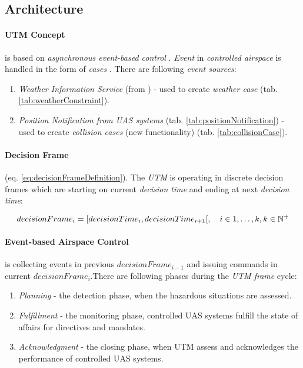 \subsection{Architecture}\label{sec:utmArchitecture}
\paragraph{UTM Concept} is based on \emph{asynchronous event-based control} \cite{zimmer2011rule}. \emph{Event} in \emph{controlled airspace} is handled in the form of \emph{cases} \cite{prevot2016uas}. There are following \emph{event sources}:

\begin{enumerate}
    \item \emph{Weather Information Service} (from \cite{zimmer2014selective}) - used to create \emph{weather case} (tab. \ref{tab:weatherConstraint}).
    
    \item \emph{Position Notification from UAS systems} (tab. \ref{tab:positionNotification}) - used to create \emph{collision cases} (new functionality) (tab. \ref{tab:collisionCase}).
\end{enumerate}


\paragraph{Decision Frame} (eq. \ref{eq:decisionFrameDefinition}). The \emph{UTM} is operating in discrete decision frames which are starting on current \emph{decision time} and ending at  next \emph{decision  time}:

\begin{equation}\label{eq:decisionFrameDefinition}
    decision Frame_i = [decision Time_i, decision Time_{i+1}[,\quad i \in {1,\dots,k}, k \in \mathbb{N}^+
\end{equation}

\paragraph{Event-based Airspace Control} is collecting  events in  previous $decisionFrame_{i-1}$ and issuing commands in current $decisionFrame_i$.There are following phases during the \emph{UTM frame} cycle:
\begin{enumerate}
    \item \emph{Planning} - the detection phase, when the hazardous situations are assessed.
    
    \item \emph{Fulfillment} - the monitoring phase, controlled UAS systems fulfill the state of affairs for directives and mandates. 
    
    \item \emph{Acknowledgment} - the closing phase, when UTM assess and acknowledges the performance of controlled UAS systems.
\end{enumerate}


